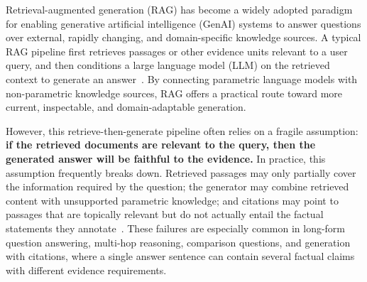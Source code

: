 Retrieval-augmented generation (RAG) has become a widely adopted paradigm for enabling generative artificial intelligence (GenAI) systems to answer questions over external, rapidly changing, and domain-specific knowledge sources. A typical RAG pipeline first retrieves passages or other evidence units relevant to a user query, and then conditions a large language model (LLM) on the retrieved context to generate an answer~\cite{lewis2020retrieval,gao2023retrieval}. By connecting parametric language models with non-parametric knowledge sources, RAG offers a practical route toward more current, inspectable, and domain-adaptable generation. 

However, this retrieve-then-generate pipeline often relies on a fragile assumption: \textbf{if the retrieved documents are relevant to the query, then the generated answer will be faithful to the evidence.} In practice, this assumption frequently breaks down. Retrieved passages may only partially cover the information required by the question; the generator may combine retrieved content with unsupported parametric knowledge; and citations may point to passages that are topically relevant but do not actually entail the factual statements they annotate~\cite{gao2023enabling,wallat2025correctness}. These failures are especially common in long-form question answering, multi-hop reasoning, comparison questions, and generation with citations, where a single answer sentence can contain several factual claims with different evidence requirements.

